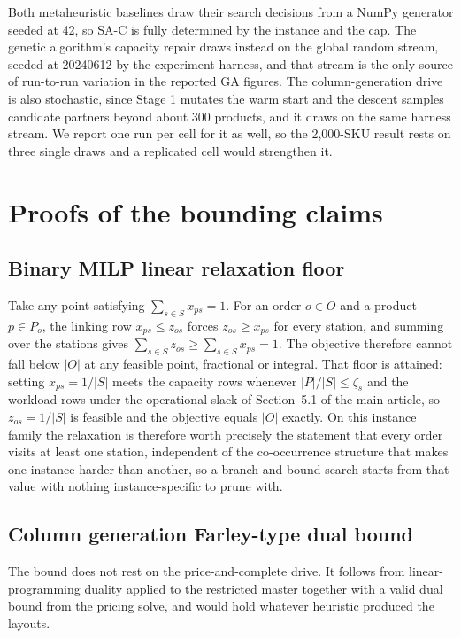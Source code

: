 \documentclass[11pt]{article}
\begin{document}
Both metaheuristic baselines draw their search decisions from a NumPy generator seeded at 42, so
SA-C is fully determined by the instance and the cap. The genetic algorithm's capacity repair draws
instead on the global random stream, seeded at 20240612 by the experiment harness, and that stream
is the only source of run-to-run variation in the reported GA figures. The column-generation drive
is also stochastic, since Stage 1 mutates the warm start and the descent samples candidate partners
beyond about 300 products, and it draws on the same harness stream. We report one run per cell for
it as well, so the 2,000-SKU result rests on three single draws and a replicated cell would
strengthen it.

\section{Proofs of the bounding claims}\label{sup:proofs}

\subsection{Binary MILP linear relaxation floor}\label{sup:bounds_milp}
Take any point satisfying $\sum_{s\in S} x_{ps}=1$. For an order $o \in O$ and a product
$p \in P_o$, the linking row $x_{ps}\le z_{os}$ forces $z_{os}\ge x_{ps}$ for every station, and
summing over the stations gives $\sum_{s\in S} z_{os}\ge\sum_{s\in S} x_{ps}=1$. The objective
therefore cannot fall below $|O|$ at any feasible point, fractional or integral. That floor is
attained: setting $x_{ps}=1/|S|$ meets the capacity rows whenever $|P|/|S|\le\zeta_s$ and the
workload rows under the operational slack of Section~5.1 of the main article, so $z_{os}=1/|S|$ is
feasible and the objective equals $|O|$ exactly. On this instance family the relaxation is
therefore worth precisely the statement that every order visits at least one station, independent
of the co-occurrence structure that makes one instance harder than another, so a branch-and-bound
search starts from that value with nothing instance-specific to prune with.

\subsection{Column generation Farley-type dual bound}\label{sup:bounds_cg}
The bound does not rest on the price-and-complete drive. It follows from linear-programming duality
applied to the restricted master together with a valid dual bound from the pricing solve, and would
hold whatever heuristic produced the layouts.
\end{document}
